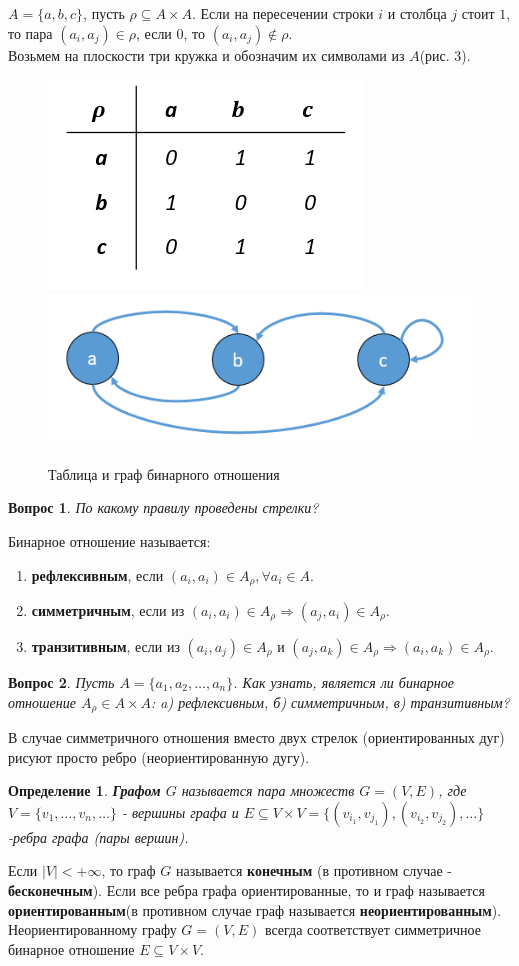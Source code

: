\documentclass{article}
\newtheorem{question}{Вопрос}
\newtheorem{definition}{Определение}
\numberwithin{example}{section}
\numberwithin{question}{section}
\numberwithin{Remark}{section}
\numberwithin{theorem}{section}
\numberwithin{definition}{section}
\numberwithin{proposition}{section}
\begin{document}
$A=\{a,b,c \}$, пусть $\rho\subseteq A\times A$. Если на пересечении строки $i$ и столбца $j$ стоит $1$, то пара $(a_i,a_j)\in\rho$, если $0$, то $(a_i,a_j)\notin\rho$.\\
Возьмем на плоскости три кружка и обозначим их символами из $A$(рис. 3).
\begin{figure}[!htp]
	\centering
	\includegraphics[width=0.3\linewidth]{1-2}
	\includegraphics[width=0.3\linewidth]{1-3}
	\caption{Таблица и граф бинарного отношения}
\end{figure}
\begin{question}
	По какому правилу проведены стрелки?
\end{question}
Бинарное отношение называется:
\begin{enumerate}
	\item \textbf{рефлексивным}, если $(a_i,a_i)\in A_{\rho},\forall a_i\in A$.
	\item \textbf{симметричным}, если из $(a_i,a_i)\in A_{\rho}\Rightarrow(a_j,a_i)\in A_{\rho}$.
	\item \textbf{транзитивным}, если из $(a_i,a_j)\in A_{\rho}$ и $(a_j,a_k)\in A_{\rho}\Rightarrow (a_i,a_k)\in A_{\rho}$.
\end{enumerate}
\begin{question}
	Пусть $A=\{a_1,a_2,\ldots,a_n \}$. Как узнать, является ли бинарное отношение $A_{\rho}\in A\times A$: a) рефлексивным, б) симметричным, в) транзитивным?
\end{question}
В случае симметричного отношения вместо двух стрелок (ориентированных дуг) рисуют просто ребро (неориентированную дугу).
\begin{definition}
\textbf{Графом} $G$ называется пара множеств $G=(V,E)$, где $V=\{v_1,\ldots,v_n,\ldots \}$ - вершины графа и $E\subseteq V\times V=\{(v_{i_1},v_{j_1}),(v_{i_2},v_{j_2}),\ldots \}$ -ребра графа (пары вершин). 
\end{definition}
Если $|V|< +\infty$, то граф $G$ называется \textbf{конечным} (в противном случае - \textbf{бесконечным}). Если все ребра графа ориентированные, то и граф называется \textbf{ориентированным}(в противном случае граф называется \textbf{неориентированным}). Неориентированному графу $G=(V,E)$ всегда соответствует симметричное бинарное отношение $E\subseteq V\times V$. 
\end{document}

